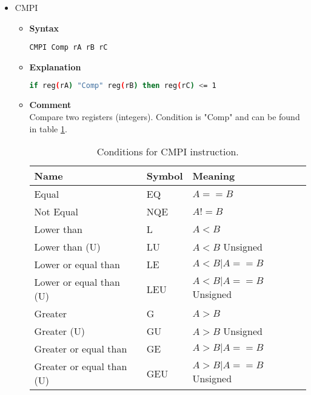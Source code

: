 \begin{itemize}
    \item CMPI
    \begin{itemize}
        \item \textbf{Syntax}
        \begin{lstlisting}[language={[markII]Assembler}, frame=single]
    CMPI Comp rA rB rC
        \end{lstlisting}
        \item \textbf{Explanation}
        \begin{lstlisting}[language=bash, frame=single]
    if reg(rA) "Comp" reg(rB) then reg(rC) <= 1
        \end{lstlisting}
        \item \textbf{Comment} \\
    Compare two registers (integers). Condition is "Comp" and can be found in table \ref{tab:cmp_conds_i}.

    \begin{table}[h]
        \centering
        \begin{tabular}{|l|l|l|}
            \hline
            \textbf{Name}             & \textbf{Symbol} & \textbf{Meaning}      \\ \hline
            Equal                     & EQ              & $A==B$                \\ \hline
            Not Equal                 & NQE             & $A!=B$                \\ \hline
            Lower than                & L               & $A<B$                 \\ \hline
            Lower than (U)            & LU              & $A<B$ Unsigned        \\ \hline
            Lower or equal than       & LE              & $A<B | A==B$          \\ \hline
            Lower or equal than (U)   & LEU             & $A<B | A==B$ Unsigned \\ \hline
            Greater                   & G               & $A>B$                 \\ \hline
            Greater (U)               & GU              & $A>B$ Unsigned        \\ \hline
            Greater or equal than     & GE              & $A>B | A==B$          \\ \hline
            Greater or equal than (U) & GEU             & $A>B | A==B$ Unsigned \\ \hline
        \end{tabular}
        \caption{Conditions for CMPI instruction.}
        \label{tab:cmp_conds_i}
    \end{table}


\end{itemize}
\end{itemize}
